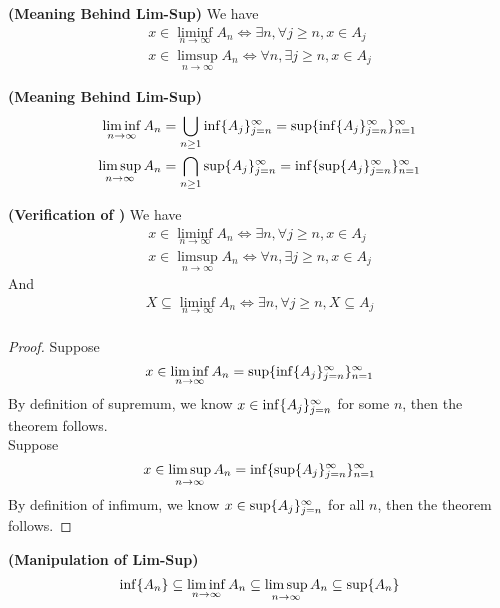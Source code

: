 \documentclass{report}
\begin{document}
\begin{theorem}
\label{0.7.6}
\textbf{(Meaning Behind Lim-Sup)} We have
\begin{gather}
x\in \liminf_{n\to\infty} A_n\iff \exists  n,\forall  j\geq n, x\in A_j\\
x\in \limsup_{n\to\infty} A_n\iff \forall n,\exists j\geq n, x\in A_j
\end{gather}
\end{theorem}
\begin{theorem}
\label{0.7.7}
\textbf{(Meaning Behind Lim-Sup)}
\begin{gather}
\liminf_{n\to\infty} A_n=\bigcup_{n\geq 1}\inf \{ A_j \}_{j=n}^\infty=\sup \{ \inf \{ A_j \}_{j=n}^\infty \}_{n=1}^\infty\\
\limsup_{n\to\infty} A_n=\bigcap_{n\geq 1}\sup \{ A_j \}_{j=n}^\infty=\inf \{ \sup \{ A_j \}_{j=n}^\infty \}_{n=1}^\infty
\end{gather}
\end{theorem}
\begin{corollary}
\label{0.7.8}
\textbf{(Verification of )} We have
\begin{gather}
x\in \liminf_{n\to\infty} A_n\iff \exists  n,\forall  j\geq n, x\in A_j\\
x\in \limsup_{n\to\infty} A_n\iff \forall n,\exists j\geq n, x\in A_j
\end{gather}
And
\begin{gather}
X\subseteq \liminf_{n\to\infty} A_n\iff \exists n,\forall j\geq n,X\subseteq A_j\\
\end{gather}
\end{corollary}
\begin{proof}
Suppose
\begin{equation}
x\in \liminf_{n\to\infty} A_n=\sup \{ \inf \{ A_j \}_{j=n}^\infty \}_{n=1}^\infty
\end{equation}
By definition of supremum, we know $x\in \inf \{ A_j \}_{j=n}^\infty$ for some $n$, then the theorem follows.\\

Suppose 
\begin{equation}
x\in \limsup_{n\to\infty} A_n=\inf \{ \sup \{ A_j \}_{j=n}^\infty \}_{n=1}^\infty
\end{equation}
By definition of infimum, we know $x \in \sup \{ A_j \}_{j=n}^\infty$ for all $n$, then the theorem follows.
\end{proof}
\begin{corollary}
\label{0.7.9}
\textbf{(Manipulation of Lim-Sup)}
\begin{equation}
\inf \{ A_n \}\subseteq \liminf_{n\to\infty} A_n\subseteq \limsup_{n\to\infty} A_n\subseteq \sup \{ A_n \}
\end{equation}
\end{corollary}
\end{document}
